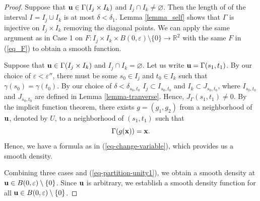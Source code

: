\documentclass[10pt,a4paper]{amsart}
\newcommand{\RR}{{\mathbb R}}
\begin{document}
\begin{proof}
 Suppose that ${\bf u}\in \Gamma(I_j\times I_k)$ and $I_j\cap I_k\ne\varnothing$. Then the length of of the interval $I= I_j\cup I_k$ is at most $\delta<\delta_1$. Lemma \ref{lemma_self} shows that $\Gamma$ is injective on $I_j\times I_k$ removing the diagonal points. We can apply the same argument as in Case 1 on $F: I_j\times I_k\times B(0,\varepsilon)\setminus \{0\} \to \RR^2 $ with the same $F$ in (\ref{eq_F}) to obtain a smooth function. 

 Suppose that ${\bf u}\in \Gamma(I_j\times I_k)$ and $I_j\cap I_k=\varnothing$. Let us write ${\bf u}  = \Gamma (s_1,t_1)$.   By our choice of $\varepsilon<\varepsilon''$, there must be some $s_0\in I_j$ and $t_0\in I_k$ such that $\gamma(s_0) = \gamma(t_0).$ By our choice of $\delta<\delta_{s_0,t_0}$ $I_j\subset I_{s_0,t_0}$ and $I_k\subset J_{s_0,t_0}$, where $I_{s_0,t_0}$ and $J_{s_0,t_0}$ are defined in Lemma \ref{lemma-tranverse}. Hence, $J_{\Gamma}(s_1,t_1)\ne 0$.  By the implicit function theorem, there exists $g = (g_1,g_2)$ from a neighborhood of ${\bf u}$, denoted by $U$, to a neighborhood of $(s_1,t_1)$ such that 
$$
\Gamma (g({\bf x})) = {\bf x}.
$$
Hence, we have a formula as in (\ref{eq-change-variable}), which provides us a smooth density. 

Combining three cases and (\ref{eq-partition-unity1}), we obtain a smooth density at ${\bf u}\in B(0,\varepsilon)\setminus\{0\}$. Since ${\bf u}$ is arbitrary, we establish a smooth density function for all ${\bf u}\in B(0,\varepsilon)\setminus \{0\}$.
\end{proof}
\end{document}

